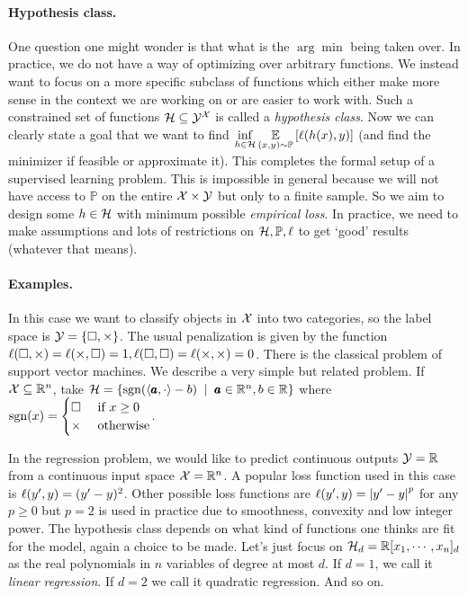 \paragraph{Hypothesis class.} One question one might wonder is that what is the $\arg\min$ being taken over. In practice, we do not have a way of optimizing over arbitrary functions. We instead want to focus on a more specific subclass of functions which either make more sense in the context we are working on or are easier to work with. Such a constrained set of functions ${\mathcal{H}} \subseteq {\mathcal{Y}}^{{\mathcal{X}}}$ is called a \textit{hypothesis class}. Now we can clearly state a goal that we want to find $\displaystyle\inf_{h\in{\mathcal{H}}} \underset{(x,y)\sim\mathbb P}{\mathbb E} \left[\ell(h(x),y)\right]$ (and find the minimizer if feasible or approximate it). This completes the formal setup of a supervised learning problem. This is impossible in general because we will not have access to $\mathbb P$ on the entire ${\mathcal{X}}\times {\mathcal{Y}}$ but only to a finite sample. So we aim to design some $h\in {\mathcal{H}}$ with minimum possible \textit{empirical loss}. In practice, we need to make assumptions and lots of restrictions on ${\mathcal{H}},\mathbb P, \ell$ to get `good' results (whatever that means).

\paragraph{Examples.}
\begin{ex}
In this case we want to classify objects in ${\mathcal{X}}$ into two categories, so the label space is ${\mathcal{Y}}=\left\{\square, \times\right\}$. The usual penalization is given by the function $\ell(\square, \times) = \ell(\times,\square) = 1, \ell(\square,\square)=\ell(\times,\times)=0$. There is the classical problem of support vector machines. We describe a very simple but related problem. If ${\mathcal{X}}\subseteq \mathbb{R}^{n}$, take $\cH=\set{\sgn(\inner{\pmb a}{\cdot} - b)\st \pmb a\in\R^{n}, b\in \R}$ where $\operatorname{sgn}(x) = \begin{cases}
\square & \text{ if } x\ge 0\\
\times & \text{ otherwise}
\end{cases}$. 
\end{ex}

\begin{ex}[Regression]
In the regression problem, we would like to predict continuous outputs ${\mathcal{Y}}=\mathbb{R}$ from a continuous input space ${\mathcal{X}} = \mathbb{R}^{n}$. A popular loss function used in this case is $\ell(y',y) = (y'-y)^{2}$. Other possible loss functions are $\ell(y',y)=\left| y'-y \right|^{p}$ for any $p\ge 0$ but $p=2$ is used in practice due to smoothness, convexity and low integer power. The hypothesis class depends on what kind of functions one thinks are fit for the model, again a choice to be made. Let's just focus on ${\mathcal{H}}_{d} = \mathbb{R}[x_{1},\cdots,x_{n}]_{d}$ as the real polynomials in $n$ variables of degree at most $d$. If $d=1$, we call it \textit{linear regression}. If $d=2$ we call it quadratic regression. And so on.
\end{ex}

